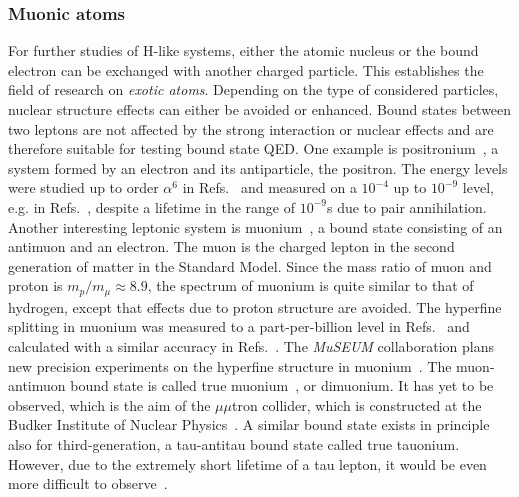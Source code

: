 \subsubsection*{Muonic atoms}
For further studies of H-like systems, either the atomic nucleus or the bound electron can be exchanged with another charged particle. This establishes the field of research on \textit{exotic atoms}. Depending on the type of considered particles, nuclear structure effects can either be avoided or enhanced. Bound states between two leptons are not affected by the strong interaction or nuclear effects and are therefore suitable for testing bound state QED. 
One example is positronium~\cite{karshenboim2004}, a system formed by an electron and its antiparticle, the positron. The energy levels were studied up to order $\alpha^6$ in Refs.~\cite{pineda1998,pachucki1998,czarnecki1999,zatorski2008} and measured on a $10^{-4}$ up to $10^{-9}$ level, e.g. in Refs.~\cite{mills1975,ritter1984,danzmann1989,hagena1993,fee1993}, despite a lifetime in the range of $10^{-9}$s due to pair annihilation. 
Another interesting leptonic system is muonium~\cite{jungmann2004}, a bound state consisting of an antimuon and an electron. The muon is the charged lepton in the second generation of matter in the Standard Model. Since the mass ratio of muon and proton is $m_p/m_\mu \approx 8.9$, the spectrum of muonium is quite similar to that of hydrogen, except that effects due to proton structure are avoided. The hyperfine splitting in muonium was measured to a part-per-billion level in Refs.~\cite{casperson1975,liu1999} and calculated with a similar accuracy in Refs.~\cite{pachucki1996,Karshenboim1996,sapirstein1997,nio1997,eides1998}. The \textit{MuSEUM} collaboration plans new precision experiments on the hyperfine structure in muonium~\cite{museum}. 
The muon-antimuon bound state is called true muonium~\cite{brodsky2009}, or dimuonium. It has yet to be observed, which is the aim of the $\mu\mu$tron collider, which is constructed at the Budker Institute of Nuclear Physics~\cite{bogomyagkov2017}. 
A similar bound state exists in principle also for third-generation, a tau-antitau bound state called true tauonium. However, due to the extremely short lifetime of a tau lepton, it would be even more difficult to observe~\cite{brodsky2009}.


